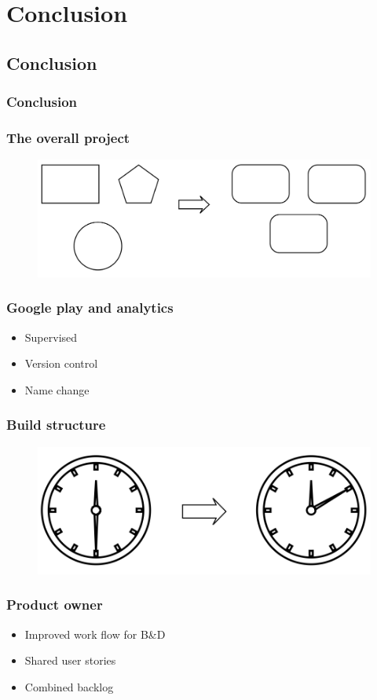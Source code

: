 \section{Conclusion}
\subsection{Conclusion}
\begin{frame}
	\frametitle{Conclusion}
\end{frame}

\begin{frame}
	\frametitle{The overall project}
	\begin{figure}[H]
		\centering
		\includegraphics[width= 0.8 \textwidth]{pictures/SameGUIDesign.png}
	\end{figure}
\end{frame}

\begin{frame}
	\frametitle{Google play and analytics}
	\begin{itemize}
		\item Supervised
		\item Version control
		\item Name change
	\end{itemize}
\end{frame}

\begin{frame}
	\frametitle{Build structure}
	\begin{figure}[H]
		\centering
		\includegraphics[width= 0.8 \textwidth]{pictures/Buildtime.png}
	\end{figure}
\end{frame}

\begin{frame}
	\frametitle{Product owner}
	\begin{itemize}
		\item Improved work flow for B\&D
		\item Shared user stories
		\item Combined backlog
	\end{itemize}
\end{frame}

